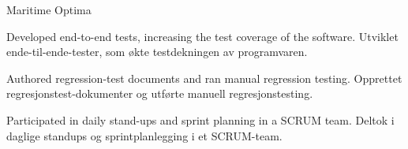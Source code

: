 \cventry
  {}
  {Maritime Optima}
  {}
  {}

\begin{cvbullets}
  \item \enor
    {Developed end-to-end tests, increasing the test coverage of the
     software.}
    {Utviklet ende-til-ende-tester, som økte testdekningen av
     programvaren.}
  \item \enor
    {Authored regression-test documents and ran manual regression
     testing.}
    {Opprettet regresjonstest-dokumenter og utførte manuell
     regresjonstesting.}
  \item \enor
    {Participated in daily stand-ups and sprint planning in a SCRUM
     team.}
    {Deltok i daglige standups og sprintplanlegging i et SCRUM-team.}
\end{cvbullets}

